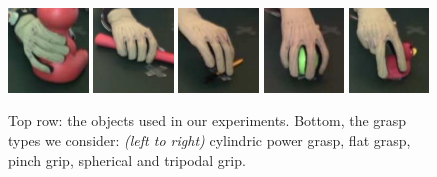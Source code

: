 \begin{figure}[h!]
	\includegraphics[width=0.19\textwidth]{images_pdf/images/cylinder}
	\includegraphics[width=0.19\textwidth]{images_pdf/images/flat}
	\includegraphics[width=0.19\textwidth]{images_pdf/images/pinch}
	\includegraphics[width=0.19\textwidth]{images_pdf/images/spherical}
	\includegraphics[width=0.19\textwidth]{images_pdf/images/tripodal}
	\caption{Top row: the objects used in our experiments. Bottom, the grasp types we consider: \emph{(left to right)} cylindric power grasp, flat grasp, pinch grip, spherical and
	tripodal grip.}
	\label{fig::grasps}
\end{figure}

